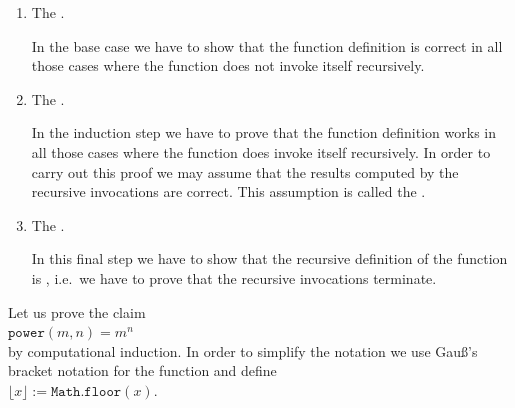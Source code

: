 \begin{enumerate}
\item The .

      In the base case we have to show that the function definition is correct in all those cases where the function
      does not invoke itself recursively.
\item The .

      In the induction step we have to prove that the function definition works in all those cases where
      the function does invoke itself recursively.  In order to carry out this proof we may
      assume that the results computed by the recursive invocations are correct.
      This assumption is called the .
\item The .

      In this final step we have to show that the recursive definition of the function is ,
      i.e.~we have to prove that the recursive invocations terminate.
\end{enumerate}
Let us prove the claim 
\\[0.2cm]
\hspace*{1.3cm}
 $\mathtt{power}(m,n) = m^n$
\\[0.2cm] 
by computational induction.  In order to simplify the notation we use Gauß's bracket notation for the
 function and define
\\[0.2cm]
\hspace*{1.3cm}
$\lfloor x \rfloor := \mathtt{Math.floor}(x)$.
\\[0.2cm]\mbox{}

